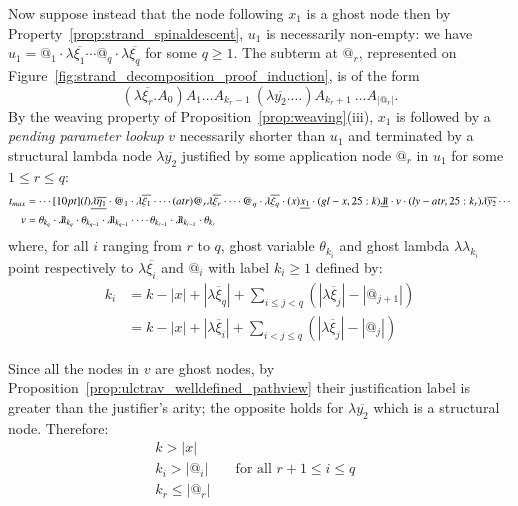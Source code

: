 \documentclass{elsarticle}
\theoremstyle{plain}
\theoremstyle{definition}
\theoremstyle{remark}
\newcommand{\ghostlmd}{{\lambda\!\!\lambda}}
\newcommand{\ghostvar}{\theta}
\begin{document}
\begin{enumerate}
Now suppose instead that the node following $x_1$ is a ghost node then by Property~\ref{prop:strand_spinaldescent}, $u_1$ is necessarily non-empty: we have $u_1 =
@_1 \cdot\lambda\overline{\xi_1} \cdots @_q\cdot \lambda\overline{\xi_q}$ for some $q\geq 1$. The subterm at $@_r$,  represented on Figure~\ref{fig:strand_decomposition_proof_induction}, is of the form
$$(\lambda\overline{\xi_r}. A_0) A_1 \ldots A_{k_{r}-1}\ (\lambda\overline{y_2}. \ldots)A_{k_{r}+1}\ \ldots A_{|@_r|} .$$
By the weaving property of Proposition~\ref{prop:weaving}(iii), $x_1$ is followed by a \emph{pending parameter lookup} $v$ necessarily shorter than $u_1$ and terminated by a structural lambda node $\lambda\overline{y_2}$ justified by some application node $@_r$ in $u_1$ for some $1\leq r \leq q$:
\begin{align*}
 t_{max} &= \cdots \Pstr[10pt]{
(l){\underline{\lambda\overline{\eta_1}}} \cdot
{@_1} \cdot \lambda\overline{\xi_1} \cdot
\cdots
(atr){@_r} \lambda\overline{\xi_r} \cdot
\cdots
{@_q} \cdot\lambda\overline{\xi_q} \cdot
(x){\underline{x_1}}\cdot
(gl-x,25:k){\underline\ghostlmd}
\cdot v
\cdot
(ly-atr,25:k_r){\lambda\overline{y_2}}
\cdots
 } \\
v &= \ghostvar_{k_q} \cdot \ghostlmd_{k_q} \cdot
\ghostvar_{k_{q-1}} \cdot \ghostlmd_{k_{q-1}} \cdot
\cdots
\ghostvar_{k_{r-1}} \cdot \ghostlmd_{k_{r-1}} \cdot
\ghostvar_{k_{r}}
\end{align*}
where, for all $i$ ranging from $r$ to $q$, ghost variable
$\ghostvar_{k_i}$ and ghost lambda $\ghostlmd_{k_i}$ point respectively to $\lambda\overline{\xi_i}$ and $@_i$ with label $k_i\geq1$ defined by:
\begin{align*}
  k_i &= k - |x| + |\lambda\overline{\xi}_q| + \sum_{i\leq j < q} (|\lambda\overline{\xi}_{j}| - |@_{j+1}|)
\\
   &= k - |x| +
  |\lambda\overline{\xi}_{i}| +
  \sum_{i< j\leq q} (|\lambda\overline{\xi}_j| - |@_j|)
\end{align*}

Since all the nodes in $v$ are ghost nodes, by Proposition~\ref{prop:ulctrav_welldefined_pathview} their justification label is greater than the justifier's arity; the opposite holds for $\lambda\overline{y_2}$ which is a structural node. Therefore:
\begin{align}
k > |x| \label{eqn:k_greater_than_x} \\
k_i > |@_i| & \quad\mbox{for all $r+1\leq i \leq q$ } \label{eqn:qnfdecomp_kj}\\
k_r \leq |@_r|
\end{align}



\end{enumerate}
\end{document}
